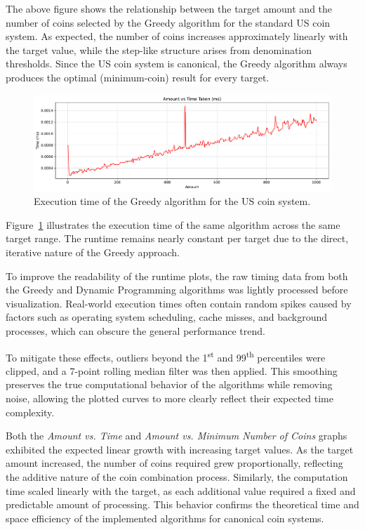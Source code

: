 \documentclass[12pt,a4paper]{report}
\begin{document}
The above figure shows the relationship between the target amount and the number of coins selected by the Greedy algorithm for the standard US coin system. As expected, the number of coins increases approximately linearly with the target value, while the step-like structure arises from denomination thresholds. Since the US coin system is canonical, the Greedy algorithm always produces the optimal (minimum-coin) result for every target.

\begin{figure}[H]
  \centering
  \includegraphics[width=\textwidth]{graphs/greedy_time_standard_plot.pdf}
  \caption{Execution time of the Greedy algorithm for the US coin system.}
  \label{fig:greedy_time_standard_plot}
\end{figure}

Figure~\ref{fig:greedy_time_standard_plot} illustrates the execution time of the same algorithm across the same target range. The runtime remains nearly constant per target due to the direct, iterative nature of the Greedy approach.

\begin{tcolorbox}[colback=gray!5!white, colframe=black, title=Note on Data Smoothing and Filtering]
To improve the readability of the runtime plots, the raw timing data from both the Greedy and Dynamic Programming algorithms was lightly processed before visualization. Real-world execution times often contain random spikes caused by factors such as operating system scheduling, cache misses, and background processes, which can obscure the general performance trend.  

To mitigate these effects, outliers beyond the 1\textsuperscript{st} and 99\textsuperscript{th} percentiles were clipped, and a 7-point rolling median filter was then applied. This smoothing preserves the true computational behavior of the algorithms while removing noise, allowing the plotted curves to more clearly reflect their expected time complexity.
\end{tcolorbox}

Both the \textit{Amount vs. Time} and \textit{Amount vs. Minimum Number of Coins} graphs exhibited the expected linear growth with increasing target values. As the target amount increased, the number of coins required grew proportionally, reflecting the additive nature of the coin combination process. Similarly, the computation time scaled linearly with the target, as each additional value required a fixed and predictable amount of processing. This behavior confirms the theoretical time and space efficiency of the implemented algorithms for canonical coin systems.\\
\end{document}

